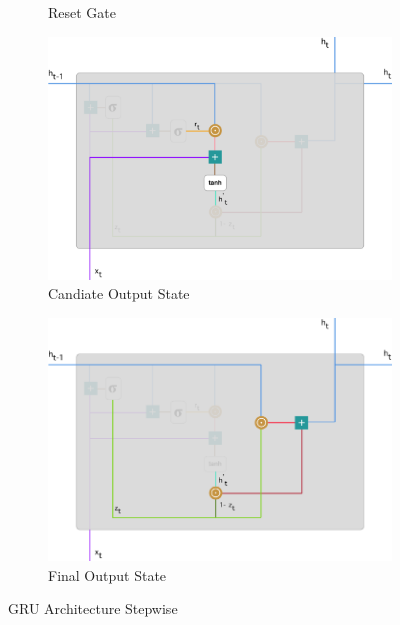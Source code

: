 \documentclass[twoside,11pt,a4paper]{article}
\begin{document}
\begin{figure}[h!]
\begin{subfigure}{0.49 \textwidth}
		\caption[Reset Gate]{Reset Gate}
		\label{fig:gru_rgate}
	\end{subfigure}
	\begin{subfigure}{0.49 \textwidth}
		\includegraphics[width=1\linewidth, height=1\linewidth]{gru_cstate}
		\caption[Candidate Output State]{Candiate Output State}
		\label{fig:gru_cstate}
	\end{subfigure}
	\hfill
	\begin{subfigure}{0.49 \textwidth}
		\includegraphics[width=1\linewidth, height=1\linewidth]{gru_nstate}
		\caption[Final Output State]{Final Output State}
		\label{fig:gru_nstate}
	\end{subfigure}
	\caption[\acs{GRU} Architecture Stepwise]{\acs{GRU} Architecture Stepwise \citep{simeon2017gru}}
	\label{fig:gru_detail}
\end{figure}
\end{document}
